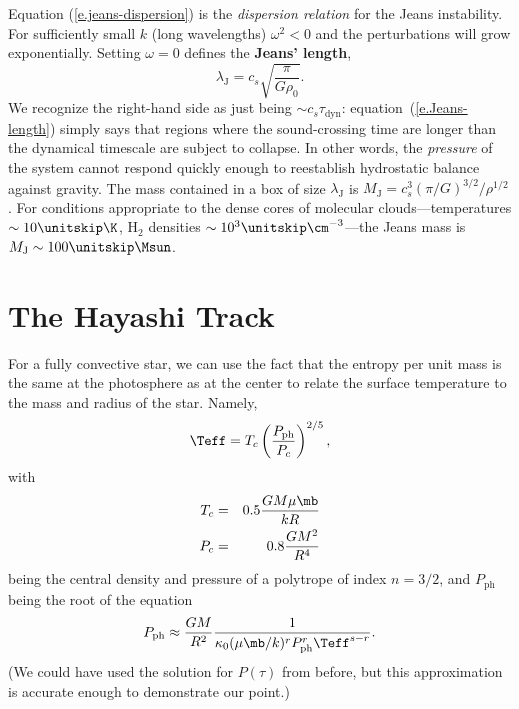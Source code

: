 Equation (\ref{e.jeans-dispersion}) is the {\it dispersion relation} for the Jeans instability.
For sufficiently small $k$ (long wavelengths) $\omega^{2}<0$ and the perturbations will grow exponentially. Setting $\omega = 0$ defines the \textbf{Jeans' length},
\begin{equation}\label{e.Jeans-length}
\lambda_{\mathrm{J}} = c_{s}\sqrt{\frac{\pi}{G\rho_{0}}}.
\end{equation}
We recognize the right-hand side as just being $\sim c_{s} \tau_{\mathrm{dyn}}$: equation~(\ref{e.Jeans-length}) simply says that regions where the sound-crossing time are longer than the dynamical timescale are subject to collapse.
In other words, the {\it pressure} of the system cannot respond quickly enough to reestablish hydrostatic balance against gravity.
The mass contained in a box of size $\lambda_{\mathrm{J}}$ is $M_{\mathrm{J}} = c_{s}^{3}(\pi/G)^{3/2}/\rho^{1/2}$.
For conditions appropriate to the dense cores of molecular clouds---temperatures $\sim 10\nsp\K$, $\mathrm{H}_{2}$ densities $\sim 10^{3}\nsp\cm^{-3}$---the Jeans mass is $M_{\mathrm{J}} \sim 100\nsp\Msun$.

\section{The Hayashi Track}\label{s.Hayashi}

For a fully convective star, we can use the fact that the entropy per unit mass is the same at the photosphere as at the center to relate the surface temperature to the mass and radius of the star. Namely,
\begin{equation}\label{e.Teff-adiabat}
\Teff = T_{c}\left(\frac{P_{\mathrm{ph}}}{P_{c}}\right)^{2/5},
\end{equation}
with
\begin{eqnarray}
T_{c} &=& 0.5 \frac{GM\mu \mb}{kR} \label{e.fc-Tc}\\
P_{c} &=& 0.8\frac{GM^{2}}{R^{4}} \label{e.fc-Pc}
\end{eqnarray}
being the central density and pressure of a polytrope of index $n=3/2$, and $P_{\mathrm{ph}}$ being the root of the equation
\begin{equation}\label{e.pph}
 P_{\mathrm{ph}} \approx \frac{GM}{R^{2}}\frac{1}{\kappa_{0}(\mu\mb/k)^{r}P_{\mathrm{ph}}^{r}\Teff^{s-r}}.
\end{equation}
(We could have used the solution for $P(\tau)$ from before, but this approximation is accurate enough to demonstrate our point.)

